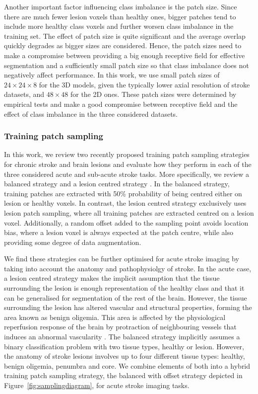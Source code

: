 \documentclass[letterpaper,final,authoryear,3p,times,twocolumn]{elsarticle}
\begin{document}
Another important factor influencing class imbalance is the patch size. Since there are much fewer lesion voxels than healthy ones, bigger patches tend to include more healthy class voxels and further worsen class imbalance in the training set. The effect of patch size is quite significant and the average overlap quickly degrades as bigger sizes are considered. Hence, the patch sizes need to make a compromise between providing a big enough receptive field for effective segmentation and a sufficiently small patch size so that class imbalance does not negatively affect performance. In this work, we use small patch sizes of $24\times24\times8$ for the 3D models, given the typically lower axial resolution of stroke datasets, and $48\times48$ for the 2D ones. These patch sizes were determined by empirical tests and make a good compromise between receptive field and the effect of class imbalance in the three considered datasets.  

\subsubsection{Training patch sampling} 

In this work, we review two recently proposed training patch sampling strategies for chronic stroke and brain lesions and evaluate how they perform in each of the three considered acute and sub-acute stroke tasks. More specifically, we review a balanced strategy \citep{Kamnitsas2017dm} and a lesion centred strategy \citep{Guerrero2018uresnet}. In the balanced strategy, training patches are extracted with 50\% probability of being centred either on lesion or healthy voxels. In contrast, the lesion centred strategy exclusively uses lesion patch sampling, where all training patches are extracted centred on a lesion voxel. Additionally, a random offset added to the sampling point avoids location bias, where a lesion voxel is always expected at the patch centre, while also providing some degree of data augmentation. 

We find these strategies can be further optimised for acute stroke imaging by taking into account the anatomy and pathophysiolgy of stroke. In the acute case, a lesion centred strategy makes the implicit assumption that the tissue surrounding the lesion is enough representation of the healthy class and that it can be generalised for segmentation of the rest of the brain. However, the tissue surrounding the lesion has altered vascular and structural properties, forming the area known as benign oligemia. This area is affected by the physiological reperfusion response of the brain by protraction of neighbouring vessels that induces an abnormal vascularity \citep{Rekik2012}. The balanced strategy implicitly assumes a binary classification problem with two tissue types, healthy or lesion. However, the anatomy of stroke lesions involves up to four different tissue types: healthy, benign oligemia, penumbra and core. We combine elements of both into a hybrid training patch sampling strategy, the balanced with offset strategy depicted in Figure~\ref{fig:samplingdiagram}, for acute stroke imaging tasks.
\end{document}
